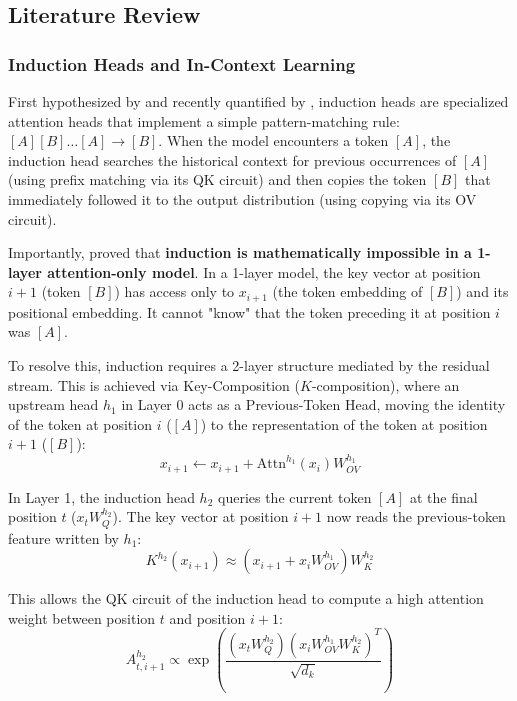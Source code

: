 \documentclass[11pt]{article}
\begin{document}
\subsection{Literature Review}

\subsubsection{Induction Heads and In-Context Learning}

First hypothesized by \citet{Elhage2021} and recently quantified by \citet{crosbie2024}, induction heads are specialized attention heads that implement a simple pattern-matching rule: $[A][B] \dots [A] \rightarrow [B]$. When the model encounters a token $[A]$, the induction head searches the historical context for previous occurrences of $[A]$ (using prefix matching via its QK circuit) and then copies the token $[B]$ that immediately followed it to the output distribution (using copying via its OV circuit).

Importantly, \citet{Elhage2021} proved that \textbf{induction is mathematically impossible in a 1-layer attention-only model}. In a 1-layer model, the key vector at position $i+1$ (token $[B]$) has access only to $x_{i+1}$ (the token embedding of $[B]$) and its positional embedding. It cannot "know" that the token preceding it at position $i$ was $[A]$.

To resolve this, induction requires a 2-layer structure mediated by the residual stream. This is achieved via Key-Composition ($K$-composition), where an upstream head $h_1$ in Layer 0 acts as a Previous-Token Head, moving the identity of the token at position $i$ ($[A]$) to the representation of the token at position $i+1$ ($[B]$):
\begin{equation}
    x_{i+1} \leftarrow x_{i+1} + \text{Attn}^{h_1}(x_{i}) W_{OV}^{h_1}
\end{equation}

In Layer 1, the induction head $h_2$ queries the current token $[A]$ at the final position $t$ ($x_t W_Q^{h_2}$). The key vector at position $i+1$ now reads the previous-token feature written by $h_1$:
\begin{equation}
    K^{h_2}(x_{i+1}) \approx \left( x_{i+1} + x_i W_{OV}^{h_1} \right) W_K^{h_2}
\end{equation}

This allows the QK circuit of the induction head to compute a high attention weight between position $t$ and position $i+1$:
\begin{equation}
    A^{h_2}_{t, i+1} \propto \exp \left( \frac{(x_t W_Q^{h_2})(x_i W_{OV}^{h_1} W_K^{h_2})^T}{\sqrt{d_k}} \right)
\end{equation}
\end{document}
